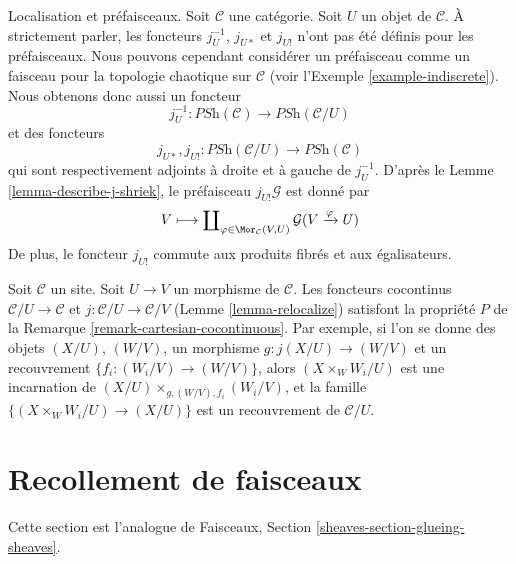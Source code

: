 \begin{remark}
\label{remark-localize-presheaves}
Localisation et préfaisceaux. Soit $\mathcal{C}$ une catégorie.
Soit $U$ un objet de $\mathcal{C}$. À strictement parler, les foncteurs
$j_U^{-1}$, $j_{U*}$ et $j_{U!}$ n’ont pas été définis pour les préfaisceaux.
Nous pouvons cependant considérer un préfaisceau comme un faisceau pour la
topologie chaotique sur $\mathcal{C}$ (voir l’Exemple
\ref{example-indiscrete}). Nous obtenons donc aussi un foncteur
$$
j_U^{-1} :
\textit{PSh}(\mathcal{C})
\longrightarrow
\textit{PSh}(\mathcal{C}/U)
$$
et des foncteurs
$$
j_{U*}, j_{U!} :
\textit{PSh}(\mathcal{C}/U)
\longrightarrow
\textit{PSh}(\mathcal{C})
$$
qui sont respectivement adjoints à droite et à gauche de $j_U^{-1}$.
D’après le Lemme \ref{lemma-describe-j-shriek}, le préfaisceau
$j_{U!}\mathcal{G}$ est donné par
$$
V \longmapsto
\coprod\nolimits_{\varphi \in \Mor_\mathcal{C}(V, U)}
\mathcal{G}(V \xrightarrow{\varphi} U)
$$
De plus, le foncteur $j_{U!}$ commute aux produits fibrés et aux égalisateurs.
\end{remark}

\begin{remark}
\label{remark-localization-cartesian-cocontinuous}
Soit $\mathcal{C}$ un site. Soit $U \to V$ un morphisme de $\mathcal{C}$.
Les foncteurs cocontinus $\mathcal{C}/U \to \mathcal{C}$ et
$j : \mathcal{C}/U \to \mathcal{C}/V$ (Lemme \ref{lemma-relocalize})
satisfont la propriété $P$ de la Remarque
\ref{remark-cartesian-cocontinuous}.
Par exemple, si l’on se donne des objets $(X/U)$, $(W/V)$, un morphisme
$g : j(X/U) \to (W/V)$ et un recouvrement
$\{f_i  : (W_i/V) \to (W/V)\}$, alors
$(X \times_W W_i/U)$ est une incarnation de
$(X/U) \times_{g, (W/V), f_i} (W_i/V)$, et la famille
$\{(X \times_W W_i/U) \to (X/U)\}$ est un recouvrement de $\mathcal{C}/U$.
\end{remark}



\section{Recollement de faisceaux}
\label{section-glueing-sheaves}

\noindent
Cette section est l’analogue de
Faisceaux, Section \ref{sheaves-section-glueing-sheaves}.


